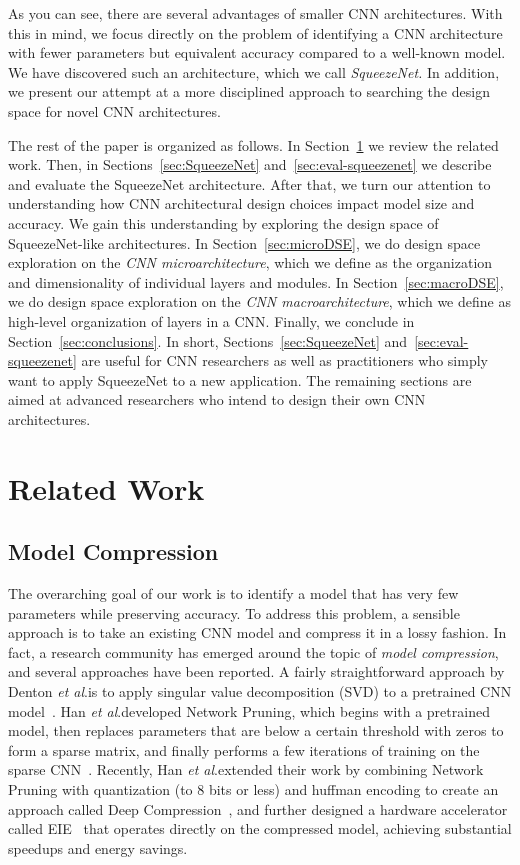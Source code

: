 \documentclass{article} \usepackage{iclr2017_conference,times}
\newcommand{\etal}{\textit{et al}.}
\renewcommand{\cite}{\citep}
\def\vsp{\vspace{-0.15in}}
\begin{document}
As you can see, there are several advantages of smaller CNN architectures.
With this in mind, we focus directly on the problem of identifying a CNN architecture with fewer parameters but equivalent accuracy compared to a well-known model.
We have discovered such an architecture, which we call {\em SqueezeNet.}
In addition, we present our attempt at a more disciplined approach to searching the design space for novel CNN architectures.

The rest of the paper is organized as follows. 
In Section~\ref{sec:related} we review the related work.
Then, in Sections~\ref{sec:SqueezeNet} and~\ref{sec:eval-squeezenet} we describe and evaluate the SqueezeNet architecture. After that, we turn our attention to understanding how CNN architectural design choices impact model size and accuracy.
We gain this understanding by exploring the design space of SqueezeNet-like architectures.
In Section~\ref{sec:microDSE}, we do design space exploration on the {\em CNN microarchitecture}, which we define as the organization and dimensionality of individual layers and modules.
In Section~\ref{sec:macroDSE}, we do design space exploration on the {\em CNN macroarchitecture}, which we define as high-level organization of layers in a CNN.
Finally, we conclude in Section~\ref{sec:conclusions}.
In short, Sections~\ref{sec:SqueezeNet} and~\ref{sec:eval-squeezenet} are useful for CNN researchers as well as practitioners who simply want to apply SqueezeNet to a new application.
The remaining sections are aimed at advanced researchers who intend to design their own CNN architectures. 

\section{Related Work}
\label{sec:related}
\vsp

\subsection{Model Compression}
\label{sec:related-model-compression}
\vsp

The overarching goal of our work is to identify a model that has very few parameters while preserving accuracy.
To address this problem, a sensible approach is to take an existing CNN model and compress it in a lossy fashion.
In fact, a research community has emerged around the topic of {\em model compression}, and several approaches have been reported.
A fairly straightforward approach by Denton \etal is to apply singular value decomposition (SVD) to a pretrained CNN model~\cite{facebook-compress-2014}.
Han \etal developed Network Pruning, which begins with a pretrained model, then replaces parameters that are below a certain threshold with zeros to form a sparse matrix, and finally performs a few iterations of training on the sparse CNN~\cite{dally2015-1}.
Recently, Han \etal extended their work by combining Network Pruning with quantization (to 8 bits or less) and huffman encoding to create an approach called Deep Compression~\cite{dally2015-2}, and further designed a hardware accelerator called EIE~\cite{EIE} that operates directly on the compressed model, achieving substantial speedups and energy savings.
\end{document}
